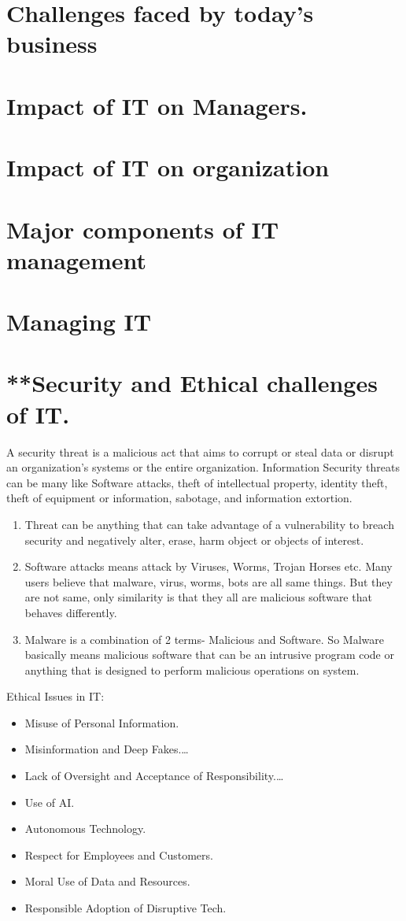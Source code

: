 \documentclass[a4paper]{article}
\begin{document}
\section{Challenges faced by today's business }
\section{Impact of IT on Managers. }
\section{Impact of IT on organization}
\section{Major components of IT management}
\section{Managing IT}
\section{**Security and Ethical challenges of IT.}
A security threat is a malicious act that aims to corrupt or steal data or disrupt an organization's systems or the entire organization.
Information Security threats can be many like Software attacks, theft of intellectual property, identity theft, theft of equipment or information, sabotage, and information extortion.
\begin{enumerate}
  \item Threat can be anything that can take advantage of a vulnerability to breach security and negatively alter, erase, harm object or objects of interest. 
  \item Software attacks means attack by Viruses, Worms, Trojan Horses etc. Many users believe that malware, virus, worms, bots are all same things. But they are not same, only similarity is that they all are malicious software that behaves differently. 
  \item Malware is a combination of 2 terms- Malicious and Software. So Malware basically means malicious software that can be an intrusive program code or anything that is designed to perform malicious operations on system.
\end{enumerate}

Ethical Issues in IT:
\begin{itemize}
  \item Misuse of Personal Information. 
  \item Misinformation and Deep Fakes.\dots
  \item Lack of Oversight and Acceptance of Responsibility.\dots
  \item Use of AI. 
  \item Autonomous Technology.
  \item Respect for Employees and Customers. 
  \item Moral Use of Data and Resources. 
  \item Responsible Adoption of Disruptive Tech.
\end{itemize}
\end{document}

